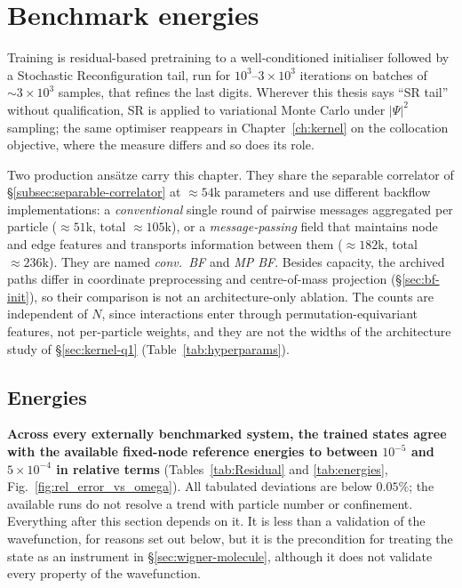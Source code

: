 \section{Benchmark energies}
\label{sec:energy-overview}

Training is residual-based pretraining to a well-conditioned initialiser followed by a
Stochastic Reconfiguration tail, run for $10^3$--$3\times10^3$ iterations on batches of
${\sim}3\times10^3$ samples, that refines the last digits. Wherever this thesis says ``SR
tail'' without qualification, SR is applied to variational Monte Carlo under $|\Psi|^2$
sampling; the same optimiser reappears in Chapter~\ref{ch:kernel} on the collocation
objective, where the measure differs and so does its role.

Two production ans\"atze carry this chapter. They share the separable correlator of
\S\ref{subsec:separable-correlator} at ${\approx}54$k parameters and use different backflow
implementations: a \emph{conventional} single round of pairwise messages aggregated per particle
(${\approx}51$k, total ${\approx}105$k), or a \emph{message-passing} field that maintains node
and edge features and transports information between them (${\approx}182$k, total
${\approx}236$k). They are named \emph{conv.\ BF} and \emph{MP BF}. Besides capacity, the
archived paths differ in coordinate preprocessing and centre-of-mass projection
(\S\ref{sec:bf-init}), so their comparison is not an architecture-only ablation. The
counts are independent of $N$, since interactions enter through permutation-equivariant features, not per-particle weights, and they are not the widths of the architecture
study of \S\ref{sec:kernel-q1} (Table~\ref{tab:hyperparams}).

\subsection{Energies}

\textbf{Across every externally benchmarked system, the trained states agree with the
available fixed-node reference energies to between $10^{-5}$ and $5\times10^{-4}$ in
relative terms} (Tables~\ref{tab:Residual} and \ref{tab:energies},
Fig.~\ref{fig:rel_error_vs_omega}). All tabulated deviations are below $0.05\%$; the available
runs do not resolve a trend with particle number or confinement.
Everything after this section depends on it. It is less than a validation of the
wavefunction, for reasons set out below, but it is the precondition for treating the state
as an instrument in \S\ref{sec:wigner-molecule}, although it does not validate every property
of the wavefunction.

